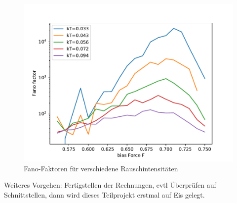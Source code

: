 \documentclass[12pt,a4paper]{article}
\begin{document}
\begin{figure}[H]
	\centering
	\includegraphics[scale=0.9]{mechfsh2.pdf} 
	\caption{Fano-Faktoren für verschiedene Rauschintensitäten}
	\label{mfsh}
\end{figure}
Weiteres Vorgehen: Fertigstellen der Rechnungen, evtl Überprüfen auf Schnittstellen, dann wird dieses Teilprojekt erstmal auf Eis gelegt.
\end{document}
